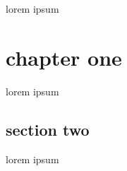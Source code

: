 


\label{0}

lorem ipsum\chapter{chapter one}

\myminitoc
\label{1}
lorem ipsum
\section{section two}
\label{2}
lorem ipsum



